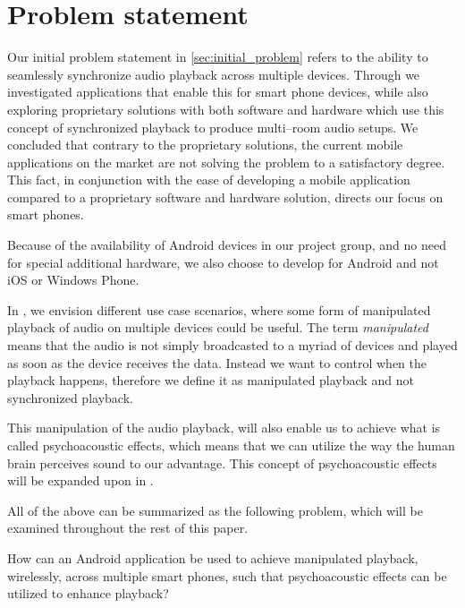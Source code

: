 \chapter{Problem statement}\label{cha:problem_statement}
Our initial problem statement in \cref{sec:initial_problem} refers to the ability to seamlessly synchronize audio playback across multiple devices.
Through  we investigated applications that enable this for smart phone devices, while also exploring proprietary solutions with both software and hardware which use this concept of synchronized playback to produce multi--room audio setups.
We concluded that contrary to the proprietary solutions, the current mobile applications on the market are not solving the problem to a satisfactory degree.
This fact, in conjunction with the ease of developing a mobile application compared to a proprietary software and hardware solution, directs our focus on smart phones.

Because of the availability of Android devices in our project group, and no need for special additional hardware, we also choose to develop for Android and not iOS or Windows Phone.

\bigskip
In , we envision different use case scenarios, where some form of manipulated playback of audio on multiple devices could be useful.
The term \textit{manipulated} means that the audio is not simply broadcasted to a myriad of devices and played as soon as the device receives the data.
Instead we want to control when the playback happens, therefore we define it as manipulated playback and not synchronized playback.

This manipulation of the audio playback, will also enable us to achieve what is called psychoacoustic effects, which means that we can utilize the way the human brain perceives sound to our advantage.
This concept of psychoacoustic effects will be expanded upon in .

\bigskip
All of the above can be summarized as the following problem, which will be examined throughout the rest of this paper.

\begin{problemstatement}
    How can an Android application be used to achieve manipulated playback, wirelessly, across multiple smart phones, such that psychoacoustic effects can be utilized to enhance playback?
\end{problemstatement}
